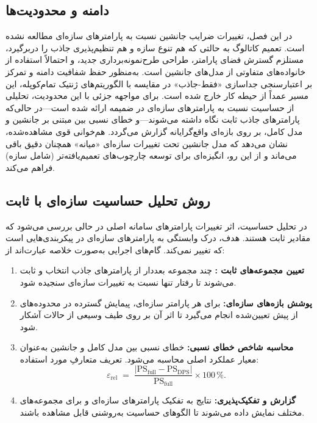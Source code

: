 \subsection{دامنه و محدودیت‌ها}
در این فصل، تغییرات ضرایب جانشین نسبت به پارامترهای سازه‌ای مطالعه نشده است. تعمیم کاتالوگ به حالتی که هم تنوع سازه و هم تنظیم‌پذیری جاذب را دربرگیرد، مستلزم گسترش فضای پارامتر، طراحی طرح‌نمونه‌برداری جدید، و احتمالاً استفاده از خانواده‌های متفاوتی از مدل‌های جانشین است. به‌منظور حفظ شفافیت دامنه و تمرکز بر اعتبارسنجی جداسازی «فقط-جاذب» در مقایسه با الگوریتم‌های ژنتیک تمام‌کوپله، این مسیر عمداً از حیطه کار خارج شده است. برای مواجهه جزئی با این محدودیت، تحلیلی از حساسیت نسبت به پارامترهای سازه‌ای در ضمیمه  ارائه شده است—در حالی‌که پارامترهای جاذب ثابت نگاه داشته می‌شوند—و خطای نسبی بین 
 مبتنی بر جانشین و 
  مدل کامل، بر روی بازه‌ای واقع‌گرایانه گزارش می‌گردد. هم‌خوانی قوی مشاهده‌شده، نشان می‌دهد که مدل جانشین تحت تغییرات سازه‌ای «میانه» همچنان دقیق باقی می‌ماند و از این رو، انگیزه‌ای برای توسعه چارچوب‌های تعمیم‌یافته‌تر (شامل سازه) فراهم می‌کند.

\subsection{روش تحلیل حساسیت سازه‌ای با  ثابت}
در تحلیل حساسیت، اثر تغییرات پارامترهای سامانه اصلی در حالی بررسی می‌شود که مقادیر 
 ثابت هستند. هدف، درک وابستگی 
  به پارامترهای سازه‌ای در پیکربندی‌هایی است که 
   تغییر نمی‌کند. گام‌های اجرایی به‌صورت خلاصه عبارت‌اند از:
\begin{enumerate}
  \item \textbf{تعیین مجموعه‌های ثابت 
  :}
   چند مجموعه بعددار از پارامترهای جاذب انتخاب و ثابت می‌شوند تا رفتار 
    تنها نسبت به تغییرات سازه‌ای سنجیده شود.
  \item \textbf{پوشش بازه‌های سازه‌ای:} برای هر پارامتر سازه‌ای، پیمایش گسترده در محدوده‌های از پیش تعیین‌شده انجام می‌گیرد تا اثر آن بر 
   روی طیف وسیعی از حالات آشکار شود.
  \item \textbf{محاسبه شاخص خطای نسبی:} خطای نسبی بین 
   مدل کامل و 
    جانشین به‌عنوان معیار عملکرد اصلی محاسبه می‌شود. تعریف متعارفِ مورد استفاده:
  \begin{equation}
    \varepsilon_{\mathrm{rel}} \;=\; \frac{\bigl|\mathrm{PS}_{\mathrm{full}} - \mathrm{PS}_{\mathrm{DPS}}\bigr|}{\mathrm{PS}_{\mathrm{full}}} \times 100\,\%.
  \end{equation}
  \item \textbf{گزارش و تفکیک‌پذیری:} نتایج به تفکیک پارامترهای سازه‌ای و برای مجموعه‌های مختلف 
   نمایش داده می‌شوند تا الگوهای حساسیت به‌روشنی قابل مشاهده باشند.
\end{enumerate}

